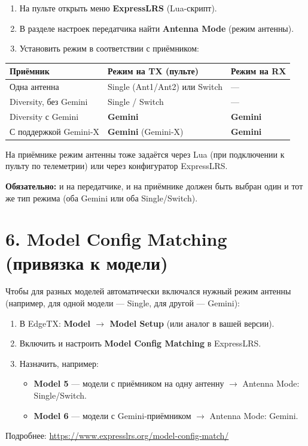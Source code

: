 \documentclass[a4paper,11pt]{article}
\begin{document}
\begin{enumerate}[nosep]
  \item На пульте открыть меню \textbf{ExpressLRS} (Lua-скрипт).
  \item В разделе настроек передатчика найти \textbf{Antenna Mode} (режим антенны).
  \item Установить режим в соответствии с приёмником:
\end{enumerate}

\begin{longtable}{lll}
  \toprule
  \textbf{Приёмник} & \textbf{Режим на TX (пульте)} & \textbf{Режим на RX} \\
  \midrule
  Одна антенна           & Single (Ant1/Ant2) или Switch & --- \\
  Diversity, без Gemini  & Single / Switch               & --- \\
  Diversity с Gemini     & \textbf{Gemini}               & \textbf{Gemini} \\
  С поддержкой Gemini-X  & \textbf{Gemini} (Gemini-X)    & \textbf{Gemini} \\
  \bottomrule
\end{longtable}

На приёмнике режим антенны тоже задаётся через Lua (при подключении к пульту по телеметрии) или через конфигуратор ExpressLRS.

\textbf{Обязательно:} и на передатчике, и на приёмнике должен быть выбран один и тот же тип режима (оба Gemini или оба Single/Switch).

\section{6. Model Config Matching (привязка к модели)}

Чтобы для разных моделей автоматически включался нужный режим антенны (например, для одной модели --- Single, для другой --- Gemini):

\begin{enumerate}[nosep]
  \item В EdgeTX: \textbf{Model $\to$ Model Setup} (или аналог в вашей версии).
  \item Включить и настроить \textbf{Model Config Matching} в ExpressLRS.
  \item Назначить, например:
  \begin{itemize}[nosep]
    \item \textbf{Model 5} --- модели с приёмником на одну антенну $\to$ Antenna Mode: Single/Switch.
    \item \textbf{Model 6} --- модели с Gemini-приёмником $\to$ Antenna Mode: Gemini.
  \end{itemize}
\end{enumerate}

Подробнее: \url{https://www.expresslrs.org/model-config-match/}
\end{document}
